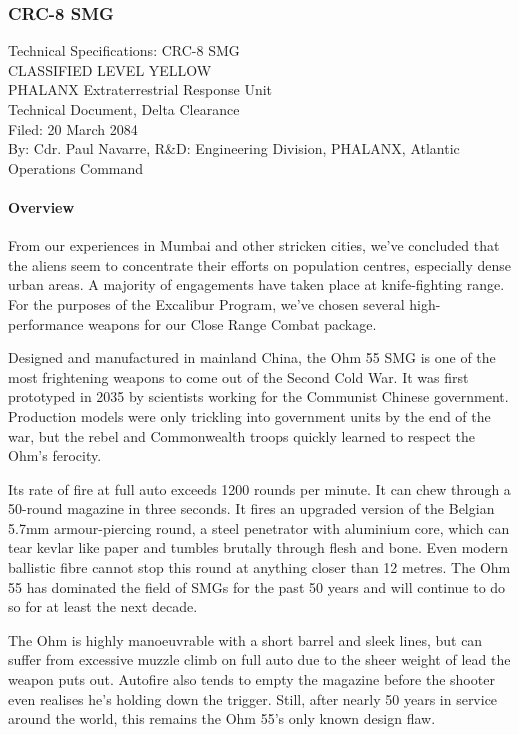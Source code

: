 \subsubsection*{CRC-8 SMG}
Technical Specifications: CRC-8 SMG\\
CLASSIFIED LEVEL YELLOW\\
PHALANX Extraterrestrial Response Unit\\
Technical Document, Delta Clearance\\
Filed: 20 March 2084\\
By: Cdr. Paul Navarre, R&D: Engineering Division, PHALANX, Atlantic Operations Command\\
\paragraph*{Overview}
From our experiences in Mumbai and other stricken cities, we've concluded that the aliens seem to concentrate their efforts on population centres, especially dense urban areas. A majority of engagements have taken place at knife-fighting range. For the purposes of the Excalibur Program, we've chosen several high-performance weapons for our Close Range Combat package.

Designed and manufactured in mainland China, the Ohm 55 SMG is one of the most frightening weapons to come out of the Second Cold War. It was first prototyped in 2035 by scientists working for the Communist Chinese government. Production models were only trickling into government units by the end of the war, but the rebel and Commonwealth troops quickly learned to respect the Ohm's ferocity.

Its rate of fire at full auto exceeds 1200 rounds per minute. It can chew through a 50-round magazine in three seconds. It fires an upgraded version of the Belgian 5.7mm armour-piercing round, a steel penetrator with aluminium core, which can tear kevlar like paper and tumbles brutally through flesh and bone. Even modern ballistic fibre cannot stop this round at anything closer than 12 metres. The Ohm 55 has dominated the field of SMGs for the past 50 years and will continue to do so for at least the next decade.

The Ohm is highly manoeuvrable with a short barrel and sleek lines, but can suffer from excessive muzzle climb on full auto due to the sheer weight of lead the weapon puts out. Autofire also tends to empty the magazine before the shooter even realises he's holding down the trigger. Still, after nearly 50 years in service around the world, this remains the Ohm 55's only known design flaw.

